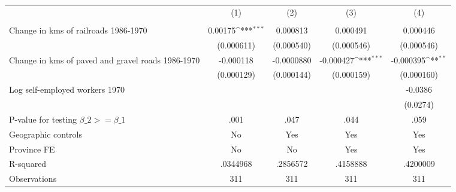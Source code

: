 {
\def\sym#1{\ifmmode^{#1}\else\(^{#1}\)\fi}
\begin{tabular}{l*{4}{c}}
\hline\hline
                &\multicolumn{1}{c}{(1)}&\multicolumn{1}{c}{(2)}&\multicolumn{1}{c}{(3)}&\multicolumn{1}{c}{(4)}\\
                &\multicolumn{1}{c}{}&\multicolumn{1}{c}{}&\multicolumn{1}{c}{}&\multicolumn{1}{c}{}\\
\hline
Change in kms of railroads 1986-1970&  0.00175\sym{***}& 0.000813         & 0.000491         & 0.000446         \\
                &(0.000611)         &(0.000540)         &(0.000546)         &(0.000546)         \\
[1em]
Change in kms of paved and gravel roads 1986-1970&-0.000118         &-0.0000880         &-0.000427\sym{***}&-0.000395\sym{**} \\
                &(0.000129)         &(0.000144)         &(0.000159)         &(0.000160)         \\
[1em]
Log self-employed workers 1970&                  &                  &                  &  -0.0386         \\
                &                  &                  &                  & (0.0274)         \\
\hline
P-value for testing $\beta\_{2} >= \beta\_{1}$&     .001         &     .047         &     .044         &     .059         \\
Geographic controls&       No         &      Yes         &      Yes         &      Yes         \\
Province FE     &       No         &       No         &      Yes         &      Yes         \\
R-squared       & .0344968         & .2856572         & .4158888         & .4200009         \\
Observations    &      311         &      311         &      311         &      311         \\
\hline\hline
\end{tabular}
}

